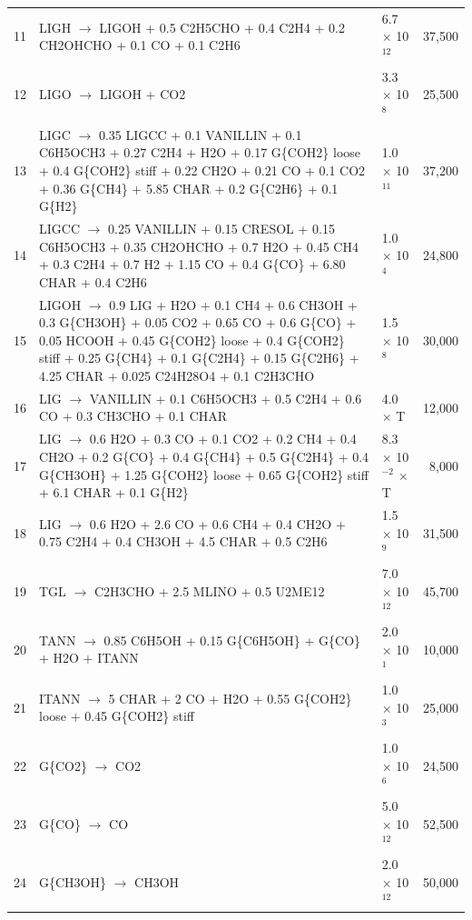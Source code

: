 \begin{center}
\begin{longtable}{cp{4in}lr}
        11 & LIGH $\rightarrow$ LIGOH + 0.5 C2H5CHO + 0.4 C2H4 + 0.2 CH2OHCHO + 0.1 CO + 0.1 C2H6 & 6.7 $\times$ 10$^{12}$ & 37,500 \\
        12 & LIGO $\rightarrow$ LIGOH + CO2 & 3.3 $\times$ 10$^8$ & 25,500 \\
        13 & LIGC $\rightarrow$ 0.35 LIGCC + 0.1 VANILLIN + 0.1 C6H5OCH3 + 0.27 C2H4 + H2O + 0.17 G\{COH2\} loose + 0.4 G\{COH2\} stiff + 0.22 CH2O + 0.21 CO + 0.1 CO2 + 0.36 G\{CH4\} + 5.85 CHAR + 0.2 G\{C2H6\} + 0.1 G\{H2\} & 1.0 $\times$ 10$^{11}$ & 37,200 \\
        14 & LIGCC $\rightarrow$ 0.25 VANILLIN + 0.15 CRESOL + 0.15 C6H5OCH3 + 0.35 CH2OHCHO + 0.7 H2O + 0.45 CH4 + 0.3 C2H4 + 0.7 H2 + 1.15 CO + 0.4 G\{CO\} + 6.80 CHAR + 0.4 C2H6 & 1.0 $\times$ 10$^4$ & 24,800 \\
        15 & LIGOH $\rightarrow$ 0.9 LIG + H2O + 0.1 CH4 + 0.6 CH3OH + 0.3 G\{CH3OH\} + 0.05 CO2 + 0.65 CO + 0.6 G\{CO\} + 0.05 HCOOH + 0.45 G\{COH2\} loose + 0.4 G\{COH2\} stiff + 0.25 G\{CH4\} + 0.1 G\{C2H4\} + 0.15 G\{C2H6\} + 4.25 CHAR + 0.025 C24H28O4 + 0.1 C2H3CHO & 1.5 $\times$ 10$^8$ & 30,000 \\
        16 & LIG $\rightarrow$ VANILLIN + 0.1 C6H5OCH3 + 0.5 C2H4 + 0.6 CO + 0.3 CH3CHO + 0.1 CHAR & 4.0 $\times$ T & 12,000 \\
        17 & LIG $\rightarrow$ 0.6 H2O + 0.3 CO + 0.1 CO2 + 0.2 CH4 + 0.4 CH2O + 0.2 G\{CO\} + 0.4 G\{CH4\} + 0.5 G\{C2H4\} + 0.4 G\{CH3OH\} + 1.25 G\{COH2\} loose + 0.65 G\{COH2\} stiff + 6.1 CHAR + 0.1 G\{H2\} & 8.3 $\times$ 10$^{-2}$ $\times$ T & 8,000 \\
        18 & LIG $\rightarrow$ 0.6 H2O + 2.6 CO + 0.6 CH4 + 0.4 CH2O + 0.75 C2H4 + 0.4 CH3OH + 4.5 CHAR + 0.5 C2H6 & 1.5 $\times$ 10$^9$ & 31,500 \\
        19 & TGL $\rightarrow$ C2H3CHO + 2.5 MLINO + 0.5 U2ME12 & 7.0 $\times$ 10$^{12}$ & 45,700 \\
        20 & TANN $\rightarrow$ 0.85 C6H5OH + 0.15 G\{C6H5OH\} + G\{CO\} + H2O + ITANN & 2.0 $\times$ 10$^1$ & 10,000 \\
        21 & ITANN $\rightarrow$ 5 CHAR + 2 CO + H2O + 0.55 G\{COH2\} loose + 0.45 G\{COH2\} stiff & 1.0 $\times$ 10$^3$ & 25,000 \\
        22 & G\{CO2\} $\rightarrow$ CO2 & 1.0 $\times$ 10$^6$ & 24,500 \\
        23 & G\{CO\} $\rightarrow$ CO & 5.0 $\times$ 10$^{12}$ & 52,500 \\
        24 & G\{CH3OH\} $\rightarrow$ CH3OH & 2.0 $\times$ 10$^{12}$ & 50,000 \\

\end{longtable}
\end{center}
